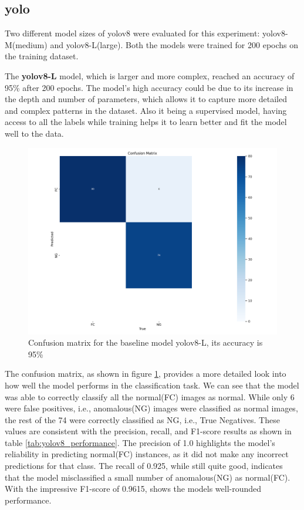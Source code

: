\subsection*{\gls{yolo}}

Two different model sizes of \gls{yolo}v8 \cite{Ultralytics2024} were evaluated for this experiment: \gls{yolo}v8-M(medium) and \gls{yolo}v8-L(large). Both the models were trained for 200 epochs on the training dataset.

The \textbf{\gls{yolo}v8-L} model, which is larger and more complex, reached an accuracy of 95\% after 200 epochs. The model's high accuracy could be due to its increase in the depth and number of parameters, which allows it to capture more detailed and complex patterns in the dataset. Also it being a supervised model, having access to all the labels while training helps it to learn better and fit the model well to the data.

\begin{figure}
    \centering
    \includegraphics[width=1.3\linewidth]{Rohit_Master_Thesis//Images/yolov8l_confusion_matrix.png}
    \caption{Confusion matrix for the baseline model \gls{yolo}v8-L, its accuracy is 95\%}
    \label{fig:yolov8l confusion matrix}
\end{figure}

The confusion matrix, as shown in figure \ref{fig:yolov8l confusion matrix}, provides a more detailed look into how well the model performs in the classification task. We can see that the model was able to correctly classify all the normal(FC) images as normal. While only 6 were false positives, i.e., anomalous(NG) images were classified as normal images, the rest of the 74 were correctly classified as NG, i.e., True Negatives. These values are consistent with the precision, recall, and F1-score results as shown in table \ref{tab:yolov8_performance}. The precision of 1.0 highlights the model's reliability in predicting normal(FC) instances, as it did not make any incorrect predictions for that class. The recall of 0.925, while still quite good, indicates that the model misclassified a small number of anomalous(NG) as normal(FC). With the impressive F1-score of 0.9615, shows the models well-rounded performance.

